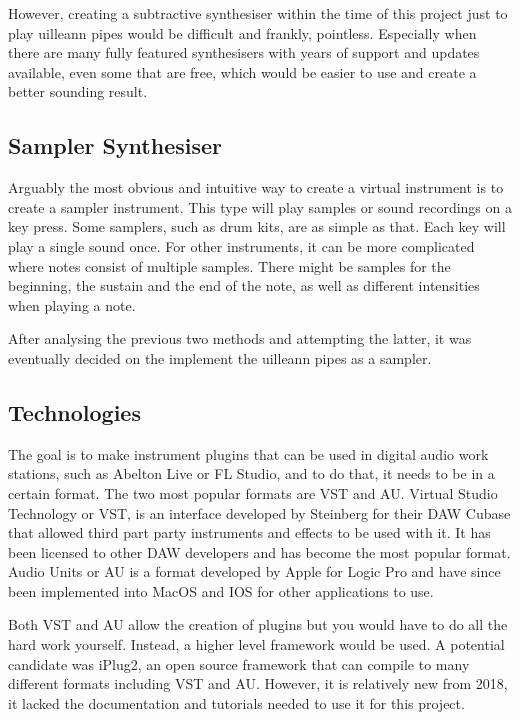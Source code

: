 \documentclass[12pt]{article}
\begin{document}
	However, creating a subtractive synthesiser within the time of this project just to play uilleann pipes would be difficult and
	frankly, pointless. Especially when there are many fully featured synthesisers with years of support and updates available, 
	even some that are free, which would be easier to use and create a better sounding result.
	
	\subsection{Sampler Synthesiser}
	Arguably the most obvious and intuitive way to create a virtual instrument is to create a sampler instrument. This type will
	play samples or sound recordings on a key press. Some samplers, such as drum kits, are as simple as that. Each key will play
	a single sound once. For other instruments, it can be more complicated where notes consist of multiple samples. There
	might be samples for the beginning, the sustain and the end of the note, as well as different intensities when playing a note.
	
	After analysing the previous two methods and attempting the latter, it was eventually decided on the implement the
	uilleann pipes as a sampler. 
	
	
	\subsection{Technologies}
	The goal is to make instrument plugins that can be used in digital audio work stations, such as Abelton Live or FL Studio,
	and to do that, it needs to be in a certain format. The two most popular formats are VST and AU. Virtual Studio Technology or
	VST, is an interface developed by Steinberg for their DAW Cubase that allowed third part party instruments and effects to be 
	used with it. It has been licensed to other DAW developers and has become the most popular format. 
	Audio Units or AU is a format developed by Apple for Logic Pro and have since been implemented into MacOS and IOS for 
	other applications to use. 
	
	Both VST and AU allow the creation of plugins but you would have to do all the hard work yourself. Instead, a higher level
	framework would be used. A potential candidate was iPlug2, an open source framework that can compile to many different 
	formats including VST and AU. However, it is relatively new from 2018, it lacked the documentation and tutorials needed
	to use it for this project.
	
\end{document}
